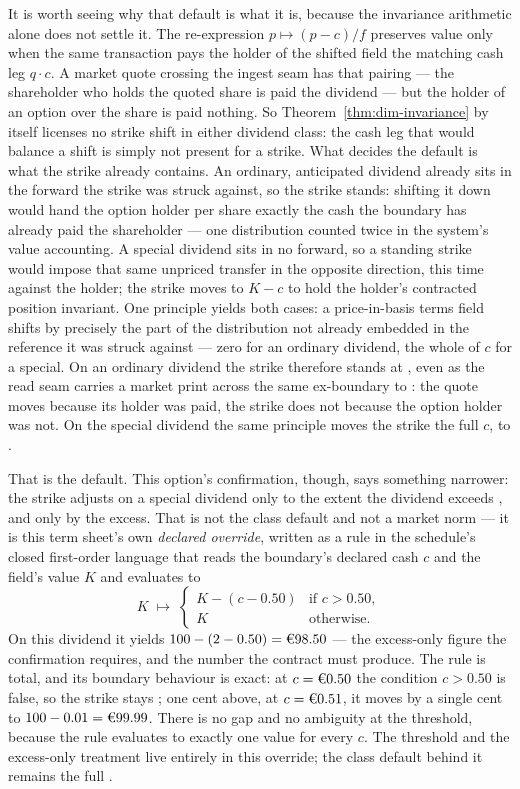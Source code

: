 It is worth seeing why that default is what it is, because the invariance arithmetic
alone does not settle it. The re-expression $p \mapsto (p - c)/f$ preserves value only
when the same transaction pays the holder of the shifted field the matching cash leg
$q \cdot c$. A market quote crossing the ingest seam has that pairing --- the
shareholder who holds the quoted share is paid the dividend --- but the holder of an
option over the share is paid nothing. So Theorem~\ref{thm:dim-invariance} by itself
licenses no strike shift in either dividend class: the cash leg that would balance a
shift is simply not present for a strike. What decides the default is what the strike
already contains. An ordinary, anticipated dividend already sits in the forward the
strike was struck against, so the strike stands: shifting it down would hand the option
holder per share exactly the cash the boundary has already paid the shareholder --- one
distribution counted twice in the system's value accounting. A special dividend sits in
no forward, so a standing strike would impose that same unpriced transfer in the
opposite direction, this time against the holder; the strike moves to $K - c$ to hold
the holder's contracted position invariant. One principle yields both cases: a
price-in-basis terms field shifts by precisely the part of the distribution not already
embedded in the reference it was struck against --- zero for an ordinary dividend, the
whole of $c$ for a special. On an ordinary  dividend the strike therefore stands
at , even as the read seam carries a  market print across the same
ex-boundary to : the quote moves because its holder was paid, the strike does
not because the option holder was not. On the special  dividend the same
principle moves the strike the full $c$, to .

That  is the default. This option's confirmation, though, says something
narrower: the strike adjusts on a special dividend only to the extent the dividend
exceeds , and only by the excess. That is not the class default and not a
market norm --- it is this term sheet's own \emph{declared override}, written as a rule
in the schedule's closed first-order language that reads the boundary's declared cash
$c$ and the field's value $K$ and evaluates to
\[
  K \;\longmapsto\;
  \begin{cases}
    K - (c - 0.50) & \text{if } c > 0.50,\\
    K & \text{otherwise.}
  \end{cases}
\]
On this  dividend it yields $100 - (2 - 0.50) = \EUR{98.50}$ --- the excess-only
figure the confirmation requires, and the number the contract must produce. The rule is
total, and its boundary behaviour is exact: at $c = \EUR{0.50}$ the condition
$c > 0.50$ is false, so the strike stays ; one cent above, at $c = \EUR{0.51}$,
it moves by a single cent to $100 - 0.01 = \EUR{99.99}$. There is no gap and no
ambiguity at the threshold, because the rule evaluates to exactly one value for every
$c$. The threshold and the excess-only treatment live entirely in this override; the
class default behind it remains the full .

